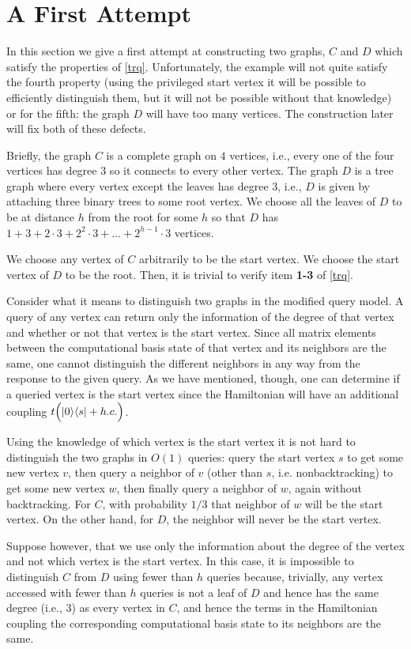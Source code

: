 \documentclass[letterpaper,onecolumn]{quantumarticle}
\begin{document}
\section{A First Attempt}
\label{toomany}
In this section we give a first attempt at constructing two graphs, $C$ and $D$ which satisfy the properties of \cref{trq}.
Unfortunately, the example will not quite satisfy the fourth property (using the privileged start vertex it will be possible to efficiently distinguish them, but it will not be possible without that knowledge) or
for the fifth: the graph $D$ will have too many vertices.
The construction later will fix both of these defects.

Briefly, the graph $C$ is a complete graph on $4$ vertices, i.e., every one of the four vertices has degree $3$ so it connects to every other vertex.
The graph $D$ is a tree graph where every vertex except the leaves has degree $3$, i.e., $D$ is given by attaching three binary trees to some root vertex.  
We choose all the leaves of $D$ to be at distance $h$ from the root for some $h$ so that $D$ has $1+3+2\cdot 3 + 2^2\cdot 3+\ldots+2^{h-1} \cdot 3$ vertices.


We choose any vertex of $C$ arbitrarily to be the start vertex.  We choose the start vertex of $D$ to be the root.  Then, it is trivial to verify item {\bf 1-3} of \cref{trq}.

Consider what it means to distinguish two graphs in the modified query model.  A query of any vertex can return only the information of the degree of that vertex and whether or not that vertex is the start vertex.  Since all matrix elements between the computational basis state of that vertex and its neighbors are the same, one cannot distinguish the different neighbors in any way from the response to the given query.  As we have mentioned, though, one can determine if a queried vertex is the start vertex since the Hamiltonian will have an additional coupling
$t\Bigl( |0\rangle\langle s| +h.c.\Bigr)$.

Using the knowledge of which vertex is the start vertex it is not hard to distinguish the two graphs in $O(1)$ queries: query the start vertex $s$ to get some new vertex $v$, then query a neighbor of $v$ (other than $s$, i.e. nonbacktracking) to get some new vertex $w$, then finally query a neighbor of $w$, again without backtracking.  For $C$, with probability $1/3$ that neighbor of $w$ will be the start vertex.  On the other hand, for $D$, the neighbor will never be the start vertex.

Suppose however, that we use only the information about the degree of the vertex and not which vertex is the start vertex.
In this case, it is impossible to distinguish $C$ from $D$ using fewer than $h$ queries because, trivially, any vertex accessed with fewer than $h$ queries is not a leaf of $D$ and hence has the same degree (i.e., $3$) as every vertex in $C$, and hence the terms in the Hamiltonian coupling the corresponding computational basis state to its neighbors are the same.
\end{document}
